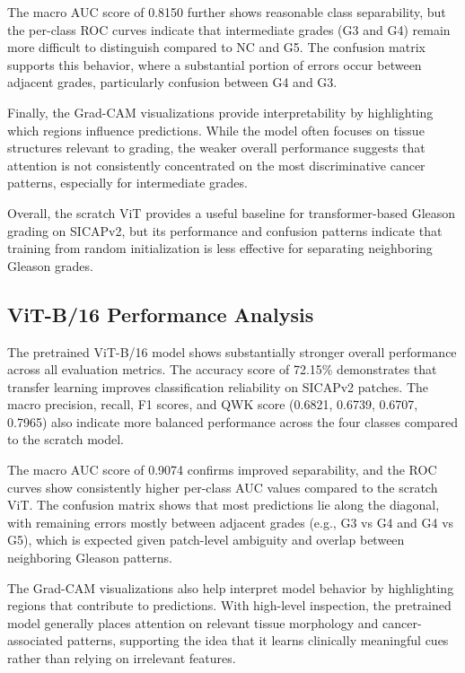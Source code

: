 \documentclass[conference]{IEEEtran}
\begin{document}
The macro AUC score of 0.8150 further shows reasonable class separability, but the per-class ROC curves indicate that intermediate grades (G3 and G4) remain more difficult to distinguish compared to NC and G5. The confusion matrix supports this behavior, where a substantial portion of errors occur between adjacent grades, particularly confusion between G4 and G3.

Finally, the Grad-CAM visualizations provide interpretability by highlighting which regions influence predictions. While the model often focuses on tissue structures relevant to grading, the weaker overall performance suggests that attention is not consistently concentrated on the most discriminative cancer patterns, especially for intermediate grades.

Overall, the scratch ViT provides a useful baseline for transformer-based Gleason grading on SICAPv2, but its performance and confusion patterns indicate that training from random initialization is less effective for separating neighboring Gleason grades.


\subsection{\textbf{ViT-B/16 Performance Analysis}}
The pretrained ViT-B/16 model shows substantially stronger overall performance across all evaluation metrics. The accuracy score of 72.15\% demonstrates that transfer learning improves classification reliability on SICAPv2 patches. The macro precision, recall, F1 scores, and QWK score (0.6821, 0.6739, 0.6707, 0.7965) also indicate more balanced performance across the four classes compared to the scratch model.


The macro AUC score of 0.9074 confirms improved separability, and the ROC curves show consistently higher per-class AUC values compared to the scratch ViT. The confusion matrix shows that most predictions lie along the diagonal, with remaining errors mostly between adjacent grades (e.g., G3 vs G4 and G4 vs G5), which is expected given patch-level ambiguity and overlap between neighboring Gleason patterns.


The Grad-CAM visualizations also help interpret model behavior by highlighting regions that contribute to predictions. With high-level inspection, the pretrained model generally places attention on relevant tissue morphology and cancer-associated patterns, supporting the idea that it learns clinically meaningful cues rather than relying on irrelevant features.
\end{document}
